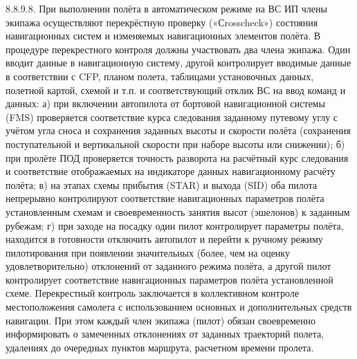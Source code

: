 8.8.9.8. При выполнении полёта в автоматическом режиме на ВС ИП члены экипажа осуществляют перекрёстную проверку («Сrosscheck») состояния навигационных систем и изменяемых навигационных элементов полёта. В процедуре перекрестного контроля должны участвовать два члена экипажа. Один вводит данные в навигационную систему, другой контролирует вводимые данные в соответствии с CFP, планом полета, таблицами установочных данных, полетной картой, схемой и т.п. и соответствующий отклик ВС на ввод команд и данных:
а)	при включении автопилота от бортовой навигационной системы (FMS) проверяется соответствие курса следования заданному путевому углу с учётом угла сноса и сохранения заданных высоты и скорости полёта (сохранения поступательной и вертикальной скорости при наборе высоты или снижении);
б)	при пролёте ПОД проверяется точность разворота на расчётный курс следования и соответствие отображаемых на индикаторе данных навигационному расчёту полёта;
в)	на этапах схемы прибытия (STAR) и выхода (SID) оба пилота непрерывно контролируют соответствие навигационных параметров полёта установленным схемам и своевременность занятия высот (эшелонов) к заданным рубежам;
г)	при заходе на посадку один пилот контролирует параметры полёта, находится в готовности отключить автопилот и перейти к ручному режиму пилотирования при появлении значительных (более, чем на оценку удовлетворительно) отклонений от заданного режима полёта, а другой пилот контролирует соответствие навигационных параметров полёта установленной схеме.
Перекрестный контроль заключается в коллективном контроле местоположения самолета с использованием основных и дополнительных средств навигации. При этом каждый член экипажа (пилот) обязан своевременно информировать о замеченных отклонениях от заданных траекторий полета, удалениях до очередных пунктов маршрута, расчетном времени пролета.

